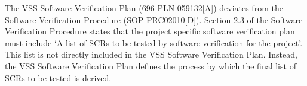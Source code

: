 The VSS Software Verification Plan (696-PLN-059132[A]) deviates from the
Software Verification Procedure (SOP-PRC02010[D]). Section 2.3 of the Software
Verification Procedure states that the project specific software verification
plan must include `A list of SCRs to be tested by software verification for the
project'. This list is not directly included in the VSS Software Verification
Plan. Instead, the VSS Software Verification Plan defines the process by which
the final list of SCRs to be tested is derived.
